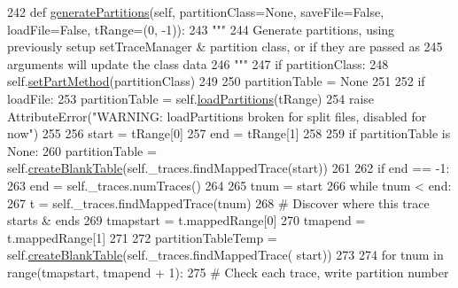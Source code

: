 \begin{DoxyCode}
242     \textcolor{keyword}{def }\hyperlink{classsoftware_1_1chipwhisperer_1_1analyzer_1_1utils_1_1Partition_1_1Partition_a099057c7cd1001eafe791e7b4bdd5dda}{generatePartitions}(self, partitionClass=None, saveFile=False, loadFile=False, 
      tRange=(0, -1)):
243         \textcolor{stringliteral}{"""}
244 \textcolor{stringliteral}{        Generate partitions, using previously setup setTraceManager & partition class, or if they are
       passed as}
245 \textcolor{stringliteral}{        arguments will update the class data}
246 \textcolor{stringliteral}{        """}
247         \textcolor{keywordflow}{if} partitionClass:
248             self.\hyperlink{classsoftware_1_1chipwhisperer_1_1analyzer_1_1utils_1_1Partition_1_1Partition_ae704605c5cab887f0353518d0b1f4310}{setPartMethod}(partitionClass)
249 
250         partitionTable = \textcolor{keywordtype}{None}
251 
252         \textcolor{keywordflow}{if} loadFile:
253             partitionTable = self.\hyperlink{classsoftware_1_1chipwhisperer_1_1analyzer_1_1utils_1_1Partition_1_1Partition_a25bf9a8e5bffb48597af03eed3e88fb8}{loadPartitions}(tRange)
254             \textcolor{keywordflow}{raise} AttributeError(\textcolor{stringliteral}{"WARNING: loadPartitions broken for split files, disabled for now"})
255 
256         start = tRange[0]
257         end = tRange[1]
258 
259         \textcolor{keywordflow}{if} partitionTable \textcolor{keywordflow}{is} \textcolor{keywordtype}{None}:
260             partitionTable = self.\hyperlink{classsoftware_1_1chipwhisperer_1_1analyzer_1_1utils_1_1Partition_1_1Partition_ab1059540a7484b4cb1d38568aac9a4ce}{createBlankTable}(self.\_traces.findMappedTrace(start))
261 
262             \textcolor{keywordflow}{if} end == -1:
263                 end = self.\_traces.numTraces()
264 
265             tnum = start
266             \textcolor{keywordflow}{while} tnum < end:
267                 t = self.\_traces.findMappedTrace(tnum)
268                 \textcolor{comment}{# Discover where this trace starts & ends}
269                 tmapstart = t.mappedRange[0]
270                 tmapend = t.mappedRange[1]
271                 
272                 partitionTableTemp = self.\hyperlink{classsoftware_1_1chipwhisperer_1_1analyzer_1_1utils_1_1Partition_1_1Partition_ab1059540a7484b4cb1d38568aac9a4ce}{createBlankTable}(self.\_traces.findMappedTrace(
      start))
273 
274                 \textcolor{keywordflow}{for} tnum \textcolor{keywordflow}{in} range(tmapstart, tmapend + 1):
275                     \textcolor{comment}{# Check each trace, write partition number}

\end{DoxyCode}
